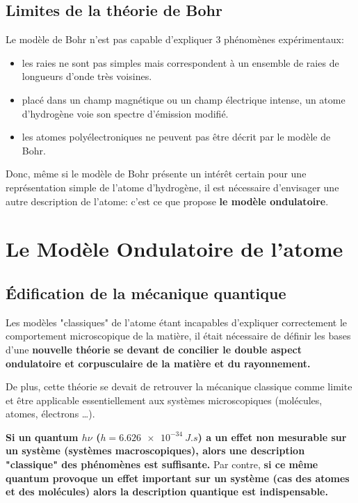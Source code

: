 \documentclass{article}
\begin{document}
\subsection{Limites de la théorie de Bohr}
\noindent Le modèle de Bohr n'est pas capable d'expliquer 3 phénomènes expérimentaux:
\begin{itemize}[label=$\ast$]
    \item les raies ne sont pas simples mais correspondent à un ensemble de raies de longueurs
    d'onde très voisines.
    \item placé dans un champ magnétique ou un champ électrique intense,
    un atome d'hydrogène voie son spectre d'émission modifié.
    \item les atomes polyélectroniques ne peuvent pas être décrit par le modèle de Bohr.
\end{itemize}

\noindent Donc, même si le modèle de Bohr présente un intérêt certain pour une représentation 
simple de l'atome d'hydrogène, il est nécessaire d'envisager une autre description de l'atome: c'est ce que propose \textbf{le modèle ondulatoire}. 


\section{Le Modèle Ondulatoire de l'atome}

\subsection{Édification de la mécanique quantique}

Les modèles "classiques" de l'atome étant incapables d'expliquer correctement le
comportement microscopique de la matière, il était nécessaire de définir les bases
d'une \textbf{nouvelle théorie se devant de concilier le
double aspect ondulatoire et corpusculaire de la matière et du rayonnement.} 

De plus, cette théorie se devait de retrouver la mécanique classique comme limite
et être applicable essentiellement aux systèmes microscopiques
(molécules, atomes, électrons \dots). 

\textbf{Si un quantum $h\nu$ ($h = \qty{6,626e-34}{J.s}$) a un effet non mesurable
sur un système (systèmes macroscopiques), alors une description
"classique" des phénomènes est suffisante.} Par contre, \textbf{si ce même quantum provoque un
effet important sur un système (cas des atomes et des molécules) alors la description quantique est indispensable.}
\end{document}
